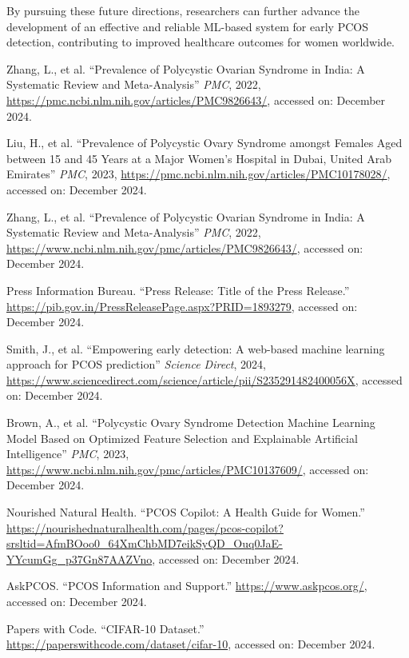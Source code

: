 \documentclass{article}
\begin{document}
By pursuing these future directions, researchers can further advance the development of an effective and reliable ML-based system for early PCOS detection, contributing to improved healthcare outcomes for women worldwide.


\begin{thebibliography}{99}
   

    Zhang, L., et al. ``Prevalence of Polycystic Ovarian Syndrome in India: A Systematic Review and Meta-Analysis'' \textit{PMC}, 2022, \url{https://pmc.ncbi.nlm.nih.gov/articles/PMC9826643/}, accessed on: December 2024.

    Liu, H., et al. ``Prevalence of Polycystic Ovary Syndrome amongst Females Aged between 15 and 45 Years at a Major Women’s Hospital in Dubai, United Arab Emirates'' \textit{PMC}, 2023, \url{https://pmc.ncbi.nlm.nih.gov/articles/PMC10178028/}, accessed on: December 2024.

    Zhang, L., et al. ``Prevalence of Polycystic Ovarian Syndrome in India: A Systematic Review and Meta-Analysis'' \textit{PMC}, 2022, \url{https://www.ncbi.nlm.nih.gov/pmc/articles/PMC9826643/}, accessed on: December 2024.
    
    Press Information Bureau. ``Press Release: Title of the Press Release.'' \url{https://pib.gov.in/PressReleasePage.aspx?PRID=1893279}, accessed on: December 2024.
    
    Smith, J., et al. ``Empowering early detection: A web-based machine learning approach for PCOS prediction'' \textit{Science Direct}, 2024, \url{https://www.sciencedirect.com/science/article/pii/S235291482400056X}, accessed on: December 2024.
    
    Brown, A., et al. ``Polycystic Ovary Syndrome Detection Machine Learning Model Based on Optimized Feature Selection and Explainable Artificial Intelligence'' \textit{PMC}, 2023, \url{https://www.ncbi.nlm.nih.gov/pmc/articles/PMC10137609/}, accessed on: December 2024.
    
    Nourished Natural Health. ``PCOS Copilot: A Health Guide for Women.'' \url{https://nourishednaturalhealth.com/pages/pcos-copilot?srsltid=AfmBOoo0_64XmChbMD7eikSyQD_Ouq0JaE-YYcumGg_p37Gn87AAZVno}, accessed on: December 2024.
    
    AskPCOS. ``PCOS Information and Support.'' \url{https://www.askpcos.org/}, accessed on: December 2024.

    Papers with Code. ``CIFAR-10 Dataset.'' \url{https://paperswithcode.com/dataset/cifar-10}, accessed on: December 2024.
\end{thebibliography}
\end{document}
